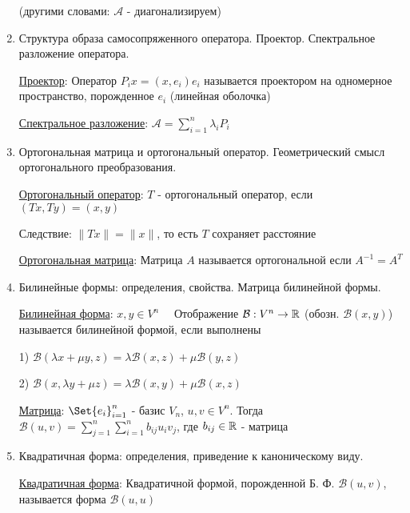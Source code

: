 \documentclass[12pt]{article}
\begin{document}
\begin{enumerate}
        (другими словами: $\mathcal{A}$ - диагонализируем)

        \item Структура образа самосопряженного оператора. Проектор. Спектральное разложение оператора.

        \hyperlink{projector}{Проектор}: Оператор $P_i x = (x, e_i) e_i$ называется проектором на одномерное пространство, порожденное $e_i$ (линейная оболочка)

        \hyperlink{spectraldecomposition}{Спектральное разложение}: $\mathcal{A} = \sum_{i = 1}^{n} \lambda_i P_i$

        \item Ортогональная матрица и ортогональный оператор. Геометрический смысл ортогонального преобразования.

        \hyperlink{orthogonaloperator}{Ортогональный оператор}: $T$ - ортогональный оператор, если $(Tx, Ty) = (x, y)$

        Следствие: $\|Tx\| = \|x\|$, то есть $T$ сохраняет расстояние

        \hyperlink{orthogonalmatrix}{Ортогональная матрица}: Матрица $A$ называется ортогональной если $A^{-1} = A^T$



        \item Билинейные формы: определения, свойства. Матрица билинейной формы.

        \hyperlink{bilinearforms}{Билинейная форма}: $x, y \in V^n \quad$ Отображение $\mathcal{B}: V^n \to \mathbb{R}$ (обозн. $\mathcal{B}(x, y)$)
        называется билинейной формой, если выполнены

        1) $\mathcal{B}(\lambda x + \mu y, z) = \lambda \mathcal{B}(x, z) + \mu \mathcal{B}(y, z)$

        2) $\mathcal{B}(x, \lambda y + \mu z) = \lambda \mathcal{B}(x, y) + \mu \mathcal{B}(x, z)$

        \hyperlink{bilinearformmatrix}{Матрица}: $\Set{e_i}_{i=1}^n$ - базис $V_n$, $u, v \in V^n$. Тогда $\mathcal{B}(u, v) =
        \sum_{j = 1}^{n}\sum_{i = 1}^{n} b_{ij} u_i v_j$, где $b_{ij} \in \mathbb{R}$ - матрица


        \item Квадратичная форма: определения, приведение к каноническому виду.

        \hyperlink{quadraticform}{Квадратичная форма}: Квадратичной формой, порожденной Б. Ф. $\mathcal{B}(u, v)$, называется форма $\mathcal{B}(u, u)$



\end{enumerate}
\end{document}
